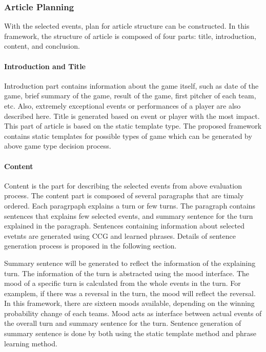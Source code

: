 \documentclass{sig-alternate}
\begin{document}
\subsubsection{Article Planning}

With the selected events, plan for article structure can be constructed. In this framework, the structure of article is composed of four parts: title, introduction, content, and conclusion. 

\paragraph{Introduction and Title} 

Introduction part contains information about the game itself, such as date of the game, brief summary of the game, result of the game, first pitcher of each team, etc. Also, extremely exceptional events or performances of a player are also described here. Title is generated based on event or player with the most impact. This part of article is based on the static template type. The proposed framework contains static templates for possible types of game which can be generated by above game type decision process. 

\paragraph{Content} 

Content is the part for describing the selected events from above evaluation process. The content part is composed of several paragraphs that are timaly ordered. Each paragrpaph explains a turn or few turns. The paragraph contains sentences that explains few selected events, and summary sentence for the turn explained in the paragraph. Sentences containing information about selected evetnts are generated using CCG and learned phrases. Details of sentence generation process is proposed in the following section. 

Summary sentence will be generated to reflect the information of the explaining turn. The information of the turn is abstracted using the mood interface. The mood of a specific turn is calculated from the whole events in the turn. For examplem, if there was a reversal in the turn, the mood will reflect the reversal. In this framework, there are sixteen moods available, depending on the winning probability change of each teams. Mood acts as interface between actual events of the overall turn and summary sentence for the turn. Sentence generation of summary sentence is done by both using the static template method and phrase learning method. 
\end{document}
